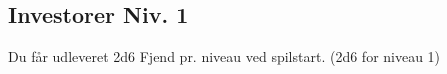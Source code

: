 \subsection{Investorer Niv. 1}
Du får udleveret 2d6 Fjend pr. niveau ved spilstart. (2d6 for niveau 1)\\